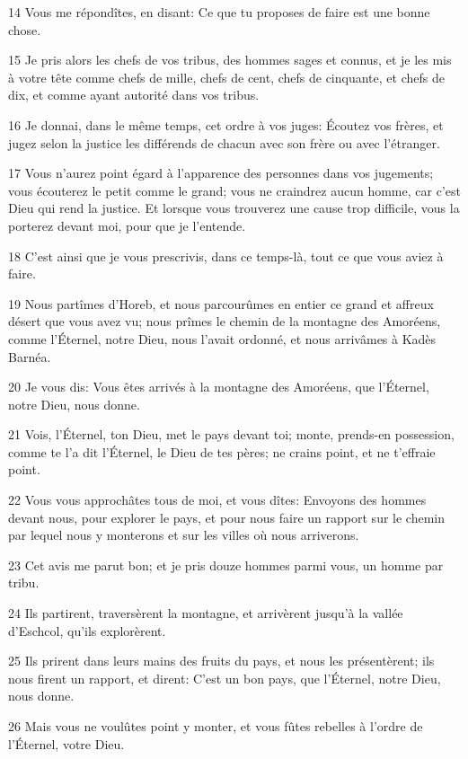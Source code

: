 \par 14 Vous me répondîtes, en disant: Ce que tu proposes de faire est une bonne chose.
\par 15 Je pris alors les chefs de vos tribus, des hommes sages et connus, et je les mis à votre tête comme chefs de mille, chefs de cent, chefs de cinquante, et chefs de dix, et comme ayant autorité dans vos tribus.
\par 16 Je donnai, dans le même temps, cet ordre à vos juges: Écoutez vos frères, et jugez selon la justice les différends de chacun avec son frère ou avec l'étranger.
\par 17 Vous n'aurez point égard à l'apparence des personnes dans vos jugements; vous écouterez le petit comme le grand; vous ne craindrez aucun homme, car c'est Dieu qui rend la justice. Et lorsque vous trouverez une cause trop difficile, vous la porterez devant moi, pour que je l'entende.
\par 18 C'est ainsi que je vous prescrivis, dans ce temps-là, tout ce que vous aviez à faire.
\par 19 Nous partîmes d'Horeb, et nous parcourûmes en entier ce grand et affreux désert que vous avez vu; nous prîmes le chemin de la montagne des Amoréens, comme l'Éternel, notre Dieu, nous l'avait ordonné, et nous arrivâmes à Kadès Barnéa.
\par 20 Je vous dis: Vous êtes arrivés à la montagne des Amoréens, que l'Éternel, notre Dieu, nous donne.
\par 21 Vois, l'Éternel, ton Dieu, met le pays devant toi; monte, prends-en possession, comme te l'a dit l'Éternel, le Dieu de tes pères; ne crains point, et ne t'effraie point.
\par 22 Vous vous approchâtes tous de moi, et vous dîtes: Envoyons des hommes devant nous, pour explorer le pays, et pour nous faire un rapport sur le chemin par lequel nous y monterons et sur les villes où nous arriverons.
\par 23 Cet avis me parut bon; et je pris douze hommes parmi vous, un homme par tribu.
\par 24 Ils partirent, traversèrent la montagne, et arrivèrent jusqu'à la vallée d'Eschcol, qu'ils explorèrent.
\par 25 Ils prirent dans leurs mains des fruits du pays, et nous les présentèrent; ils nous firent un rapport, et dirent: C'est un bon pays, que l'Éternel, notre Dieu, nous donne.
\par 26 Mais vous ne voulûtes point y monter, et vous fûtes rebelles à l'ordre de l'Éternel, votre Dieu.
